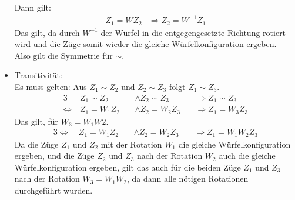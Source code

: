 \documentclass[12pt,a4paper, usenames, dvipsnames]{article}
\begin{document}
\begin{itemize}
Dann gilt: 
\begin{align*}
Z_1 = W Z_2 & \Rightarrow Z_2 = W^{-1} Z_1
\end{align*}
Das gilt, da durch $W^{-1}$ der Würfel in die entgegengesetzte Richtung rotiert wird und die Züge somit wieder die gleiche Würfelkonfiguration ergeben. \\
Also gilt die Symmetrie für $\sim$.


\item Transitivität: \\
Es muss gelten: Aus $Z_1 \sim Z_2$ und $Z_2 \sim Z_3$ folgt $Z_1 \sim Z_3$.
\begin{alignat*}{3}
& Z_1 \sim Z_2 && \wedge Z_2 \sim Z_3 && \Rightarrow Z_1 \sim Z_3 \\
\Leftrightarrow \ & Z_1 = W_1Z_2 \ && \wedge Z_2 = W_2Z_3 \ && \Rightarrow Z_1 = W_3Z_3
\end{alignat*}
Das gilt, für $W_3=W_1W2$.
\begin{alignat*}{3}
\Leftrightarrow \ & Z_1 = W_1Z_2 \ && \wedge Z_2 = W_2Z_3 \ && \Rightarrow Z_1 = W_1W_2Z_3 
\end{alignat*}
Da die Züge $Z_1$ und $Z_2$ mit der Rotation $W_1$ die gleiche Würfelkonfiguration ergeben, und die Züge $Z_2$ und $Z_3$ nach der Rotation $W_2$ auch die gleiche Würfelkonfiguration ergeben, gilt das auch für die beiden Züge $Z_1$ und $Z_3$ nach der Rotation $W_3=W_1W_2$, da dann alle nötigen Rotationen durchgeführt wurden.

\end{itemize}








\end{document}
